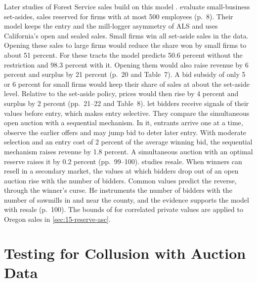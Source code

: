 Later studies of Forest Service sales build on this model \citep[Section~2.6]{HortacsuPerrigne2021}.
\citet{AtheyCoeyLevin2013} evaluate small-business set-asides, sales reserved for firms with at most 500
employees (p.~8). Their model keeps the entry and the mill-logger asymmetry of ALS and uses California's open
and sealed sales. Small firms win all set-aside sales in the data. Opening these sales to large firms
would reduce the share won by small firms to about 51 percent. For these tracts the model predicts 50.6
percent without the restriction and 98.3 percent with it. Opening them would also raise revenue by 6
percent and surplus by 21 percent (p.~20 and Table~7). A bid subsidy of only 5 or 6 percent for small
firms would keep their share of sales at about the set-aside level. Relative to the set-aside policy,
prices would then rise by 4 percent and surplus by 2 percent (pp.~21--22 and Table~8).
\citet{RobertsSweeting2013} let bidders receive signals of their
values before entry, which makes entry selective. They compare the simultaneous open auction with a
sequential mechanism. In it, entrants arrive one at a time, observe the earlier offers and may jump bid to
deter later entry. With moderate selection and an entry cost of 2 percent of the average winning bid, the
sequential mechanism raises revenue by 1.8 percent. A simultaneous auction with an optimal reserve raises
it by 0.2 percent (pp.~99--100). \citet{Haile2001} studies resale. When winners can resell in a secondary
market, the values at which bidders drop out of an open auction rise with the number of bidders. Common
values predict the reverse, through the winner's curse. He instruments the number of bidders with the number
of sawmills in and near the county, and the evidence supports the model with resale (p.~100). The bounds of
\citet{AradillasLopezGandhiQuint2013} for correlated private values are applied to Oregon sales in
\cref{sec:15-reserve-asc}.

\section{Testing for Collusion with Auction Data}\label{sec:15-collusion}

